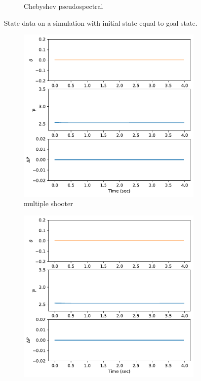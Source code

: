 \documentclass[]{article}
\begin{document}
\begin{figure}[H]
\begin{subfigure}[b]{0.3\textwidth}
 		\caption{Chebyshev pseudospectral}
 	\end{subfigure}
 	\caption{State data on a simulation with initial state equal to goal state.}
 	\label{fig:statehover}
 \end{figure}
 
 \begin{figure}[H]
 	\centering
 	\begin{subfigure}[b]{0.3\textwidth}
 		\centering
 		\includegraphics[width=\textwidth]{figures/controlhover6.pdf}
 		\caption{multiple shooter}
 	\end{subfigure}
 	\begin{subfigure}[b]{0.3\textwidth}
 		\centering
 		\includegraphics[width=\textwidth]{figures/controlhover4.pdf}

\end{subfigure}
\end{figure}
\end{document}
